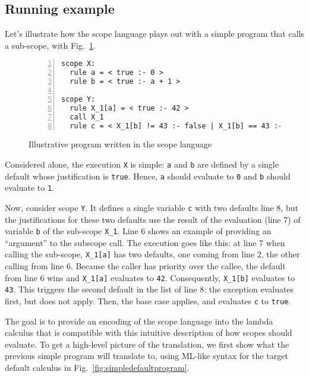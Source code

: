 \documentclass[11pt,a4paper]{article}
\begin{document}
\subsection{Running example}
\label{sec:scope:example}

Let's illustrate how the scope language plays out with a simple program 
that calls a sub-scope, with Fig.~\ref{fig:simplescopeprogram}.

\begin{figure}
\begin{Verbatim}[frame=lines,label=Simple scope program, numbers=left, framesep=10pt, samepage=true]
scope X:
  rule a = < true :- 0 >
  rule b = < true :- a + 1 >

scope Y:
  rule X_1[a] = < true :- 42 >
  call X_1
  rule c = < X_1[b] != 43 :- false | X_1[b] == 43 :- true > 
\end{Verbatim}
\caption{Illustrative program written in the scope language\label{fig:simplescopeprogram}}
\end{figure}

Considered alone, the execution \Verb+X+ is simple: \Verb+a+ and \Verb+b+ are defined by 
a single default whose justification is \Verb+true+. Hence, \Verb+a+ should evaluate 
to \Verb+0+ and \Verb+b+ should evaluate to \Verb+1+.

Now, consider scope \Verb+Y+. It defines a single variable \Verb+c+ with two defaults 
line 8, but the justifications for these two defaults use the result of 
the evaluation (line 7) of variable \Verb+b+ of the sub-scope \Verb+X_1+. 
Line 6 shows an example of providing an \enquote{argument} to the subscope call.
The execution goes like this: at line 7 when calling the sub-scope,
\Verb+X_1[a]+ has two defaults, one coming from line 2, the other calling 
from line 6. Because the caller has priority over the callee, the default from line 
6 wins and \Verb+X_1[a]+ evaluates to \Verb+42+. Consequently,
\Verb+X_1[b]+ evaluates to \Verb+43+.
This triggers the second default in the list of line 8: the exception 
evaluates first, but does not apply. Then, the base case applies,
and evaluates \Verb+c+ to \Verb+true+. 

The goal is to provide an encoding of the scope language 
into the lambda calculus that is compatible with this intuitive description 
of how scopes should evaluate. To get a high-level 
picture of the translation, we first show what the previous simple program will translate 
to, using ML-like syntax for the target default calculus in Fig.~\ref{fig:simpledefaultprogram}.
\end{document}
